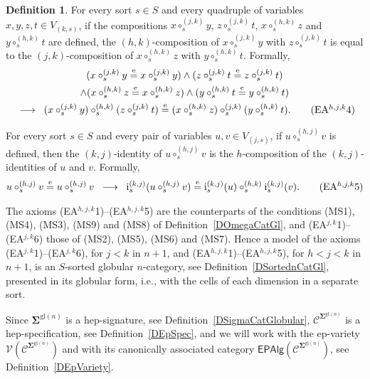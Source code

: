 \documentclass[a4paper, reqno
]{amsart}
\newcommand{\sig}[1]{\mathbf{#1}}             %
\newcommand{\spec}[1]{\boldsymbol{\mathcal{#1}}} %
\newcommand{\eeq}{\overset{\mathrm e}{=}}      %
\newcommand{\gl}{\mathrm{gl}}                %
\theoremstyle{plain}
\theoremstyle{definition}
\newtheorem{definition}[theorem]{Definition}
\begin{document}
\begin{definition}
For every sort $s\in S$ and every quadruple of variables $x,y,z,t\in V_{(k,s)}$, if the compositions $x\circ^{(j,k)}_{s}y$, $z\circ^{(j,k)}_{s}t$, $x\circ^{(h,k)}_{s}z$ and $y\circ^{(h,k)}_{s}t$ are defined, the $(h,k)$-composition of $x\circ^{(j,k)}_{s}y$ with $z\circ^{(j,k)}_{s}t$ is equal to the $(j,k)$-composition of $x\circ^{(h,k)}_{s}z$ with $y\circ^{(h,k)}_{s}t$.
Formally,
\begin{multline*}
(x\circ^{(j,k)}_{s}y\eeq x\circ^{(j,k)}_{s}y)
\wedge
(z\circ^{(j,k)}_{s}t\eeq z\circ^{(j,k)}_{s}t)
\\
\wedge
(x\circ^{(h,k)}_{s}z\eeq x\circ^{(h,k)}_{s}z)
\wedge
(y\circ^{(h,k)}_{s}t\eeq y\circ^{(h,k)}_{s}t)
\\
\;\;\longrightarrow\;\;
(x\circ^{(j,k)}_{s}y)\circ^{(h,k)}_{s}(z\circ^{(j,k)}_{s}t)\eeq
(x\circ^{(h,k)}_{s}z)\circ^{(j,k)}_{s}(y\circ^{(h,k)}_{s}t).
\label{AGlobularAhjk4}\tag{EA$^{h,j,k}$4}
\end{multline*}

For every sort $s\in S$ and every pair of variables $u,v\in V_{(j,s)}$, if $u\circ^{(h,j)}_{s}v$ is defined, then the $(k,j)$-identity of $u\circ^{(h,j)}_{s}v$ is the $h$-composition of the $(k,j)$-identities of $u$ and $v$.
Formally,
\begin{align*}
u\circ^{(h,j)}_{s}v\eeq u\circ^{(h,j)}_{s}v \;\;\longrightarrow\;\;
\mathrm{i}^{(k,j)}_{s}(u\circ^{(h,j)}_{s}v)\eeq\mathrm{i}^{(k,j)}_{s}(u)\circ^{(h,k)}_{s}\mathrm{i}^{(k,j)}_{s}(v).
\label{AGlobularAhjk5}\tag{EA$^{h,j,k}$5}
\end{align*}

The axioms (EA$^{h,j,k}$1)--(EA$^{h,j,k}$5) are the counterparts of the conditions (MS1), (MS4), (MS3), (MS9) and (MS8) of Definition~\ref{DOmegaCatGl}, and (EA$^{j,k}$1)--(EA$^{j,k}$6) those of (MS2), (MS5), (MS6) and (MS7).
Hence a model of the axioms (EA$^{j,k}$1)--(EA$^{j,k}$6), for $j<k$ in $n+1$, and (EA$^{h,j,k}$1)--(EA$^{h,j,k}$5), for $h<j<k$ in $n+1$, is an $S$-sorted globular $n$-category, see Definition~\ref{DSortednCatGl}, presented in its globular form, i.e., with the cells of each dimension in a separate sort.

Since $\sig{\Sigma}^{\gl(n)}$ is a hep-signature, see Definition~\ref{DSigmaCatGlobular}, $\spec{C}^{\sig{\Sigma}^{\gl(n)}}$ is a hep-specification, see Definition~\ref{DEpSpec}, and we will work with the ep-variety $\mathcal{V}(\spec{C}^{\sig{\Sigma}^{\gl(n)}})$ and with its canonically associated category $\mathsf{EPAlg}(\spec{C}^{\sig{\Sigma}^{\gl(n)}})$, see Definition~\ref{DEpVariety}.
\end{definition}
\end{document}

